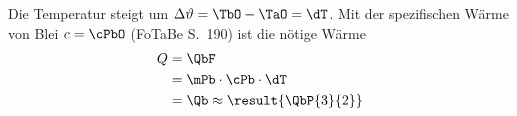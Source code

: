 Die Temperatur steigt um $\Delta\vartheta = \TbO-\TaO = \dT$. Mit der spezifischen Wärme von Blei $c = \cPbO$ (FoTaBe S.~190) ist die nötige Wärme
\begin{align}
 Q &= \QbF \\
   &= \mPb\cdot\cPb\cdot\dT \\
   &= \Qb \approx \result{\QbP{3}{2}}
\end{align}
